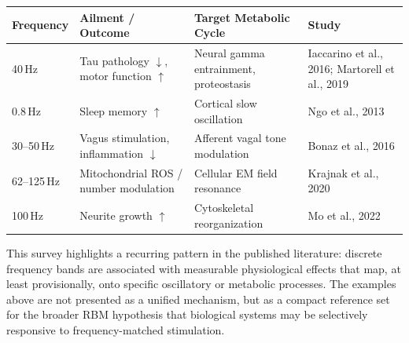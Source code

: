 \begin{table}[htbp]
\centering
\renewcommand{\arraystretch}{1.2}
\begin{tabular}{|p{2.2cm}|p{4.2cm}|p{4.2cm}|p{3.2cm}|}
\hline
\textbf{Frequency} & \textbf{Ailment / Outcome} & \textbf{Target Metabolic Cycle} & \textbf{Study} \\
\hline
40\,Hz & Tau pathology $\downarrow$, motor function $\uparrow$ & Neural gamma entrainment, proteostasis & Iaccarino et al., 2016; Martorell et al., 2019 \\
\hline
0.8\,Hz & Sleep memory $\uparrow$ & Cortical slow oscillation & Ngo et al., 2013 \\
\hline
30--50\,Hz & Vagus stimulation, inflammation $\downarrow$ & Afferent vagal tone modulation & Bonaz et al., 2016 \\
\hline
62--125\,Hz & Mitochondrial ROS / number modulation & Cellular EM field resonance & Krajnak et al., 2020 \\
\hline
100\,Hz & Neurite growth $\uparrow$ & Cytoskeletal reorganization & Mo et al., 2022 \\
\hline
\end{tabular}
\end{table}

This survey highlights a recurring pattern in the published literature: discrete frequency bands are associated with measurable physiological effects that map, at least provisionally, onto specific oscillatory or metabolic processes. The examples above are not presented as a unified mechanism, but as a compact reference set for the broader RBM hypothesis that biological systems may be selectively responsive to frequency-matched stimulation.
